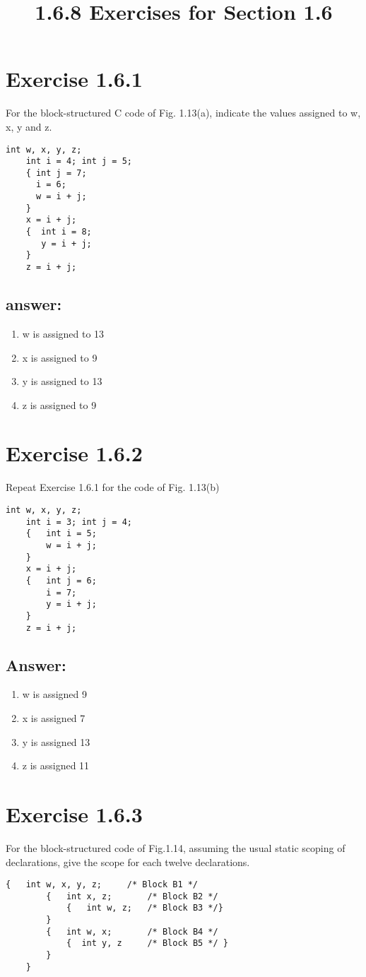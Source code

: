 \documentclass{article}
\title{1.6.8 Exercises for Section 1.6}
\begin{document}
\maketitle
\section{Exercise 1.6.1}
For the block-structured C code of Fig. 1.13(a), indicate the values assigned to w, x, y and z.
\begin{lstlisting}[style=CStyle]
	int w, x, y, z;
	int i = 4; int j = 5;
	{ int j = 7;
	  i = 6;
	  w = i + j;
    }
    x = i + j;
    {  int i = 8;
       y = i + j;
    }
    z = i + j;
\end{lstlisting}
\subsection{answer:}
\begin{enumerate}
	\item w is assigned to 13
	\item x is assigned to 9
	\item y is assigned to 13
	\item z is assigned to 9
\end{enumerate}

\newpage
\section{Exercise 1.6.2}
Repeat Exercise 1.6.1 for the code of Fig. 1.13(b)
\begin{lstlisting}[style=CStyle]
	int w, x, y, z;
	int i = 3; int j = 4;
	{	int i = 5;
		w = i + j;
	}
	x = i + j;
	{	int j = 6;
		i = 7;
		y = i + j;
	}
	z = i + j;
\end{lstlisting}

\subsection{Answer:}
\begin{enumerate}
	\item w is assigned 9
	\item x is assigned 7
	\item y is assigned 13
	\item z is assigned 11
\end{enumerate}

\newpage
\section{Exercise 1.6.3}
For the block-structured code of Fig.1.14, assuming the usual static scoping of declarations, give the scope for each twelve declarations.
\begin{lstlisting}[style=CStyle]
	{	int w, x, y, z;		/* Block B1 */
		{	int x, z;		/* Block B2 */
			{	int w, z;	/* Block B3 */}
		}
		{	int w, x;		/* Block B4 */
			{  int y, z		/* Block B5 */ }
		}
	}
\end{lstlisting}
\end{document}
